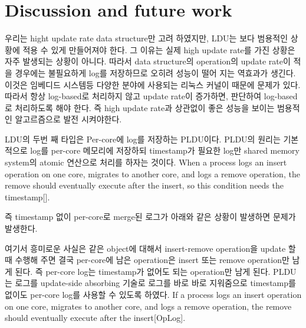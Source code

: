 \section{Discussion and future work}

\ifkor
우리는 hight update rate data structure만 고려 하였지만, LDU는 보다 범용적인 상황에 적용 수 있게 만들어져야
한다.
그 이유는 실제 high update rate를 가진 상황은 자주 발생되는 상황이 아니다. 
따라서 data structure의 operation의 update rate이 적을 경우에는 불필요하게 log를 저장하므로 오히려 성능이 떨어
지는 역효과가 생긴다.
이것은 임베디드 시스템등 다양한 분야에 사용되는 리눅스 커널이 때문에 문제가 있다. 
따라서 항상 log-based로 처리하지 않고 update rate이 증가하면, 판단하여 log-based로 처리하도록 해야 한다.
즉 high update rate과 상관없이 좋은 성능을 보이는 범용적인 알고르즘으로 발전 시켜야한다.
\else
\fi


\ifkor
LDU의 두번 째 타입은 Per-core에 log를 저장하는 PLDU이다. 
PLDU의 원리는 기본적으로 log를 per-core 메모리에 저장하되 timestamp가 필요한 log만 shared memory
system의 atomic 연산으로 처리를 하자는 것이다.
When a process logs an insert operation on one core, migrates to another core,
and logs a remove operation, the remove should eventually execute after the
insert, so this condition needs the timestamp[].

즉 timestamp 없이 per-core로 merge된 로그가 아래와 같은 상황이 발생하면 문제가 발생한다. 

    

여기서 흥미로운 사실은 같은 object에 대해서 insert-remove operation을 update 할 때 수행해
주면 결국 per-core에 남은 operation은 insert 또는 remove operation만 남게 된다. 
즉 per-core log는 timestamp가 없어도 되는 operation만 남게 된다.
PLDU는 로그를 update-side absorbing 기술로 로그를 바로 바로 지워줌으로 timestamp를 없이도 per-core
log를 사용할 수 있도록 하였다.
\else
If a process logs an insert operation on one core,
migrates to another core, and logs a remove operation, the remove should
eventually execute after the insert[OpLog].
\fi



